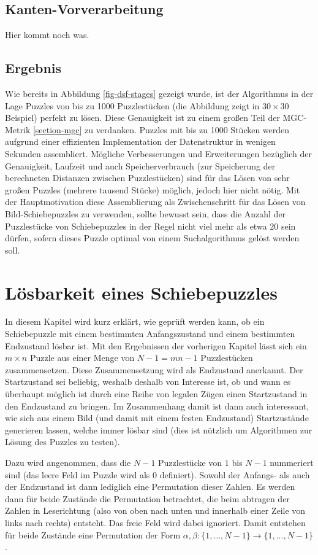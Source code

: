 \documentclass{whswinvcbook}
\begin{document}
\section{Kanten-Vorverarbeitung}
Hier kommt noch was.
\section{Ergebnis}
Wie bereits in Abbildung \ref{fig-dsf-stages} gezeigt wurde, ist der Algorithmus in der Lage Puzzles von bis zu 1000 Puzzlestücken (die Abbildung zeigt in $30\times30$ Beispiel) perfekt zu lösen. Diese Genauigkeit ist zu einem großen Teil der MGC-Metrik \ref{section-mgc} zu verdanken. Puzzles mit bis zu 1000 Stücken werden aufgrund einer effizienten Implementation der Datenstruktur in wenigen Sekunden assembliert. Mögliche Verbesserungen und Erweiterungen bezüglich der Genauigkeit, Laufzeit und auch Speicherverbrauch (zur Speicherung der berechneten Distanzen zwischen Puzzlestücken) sind für das Lösen von sehr großen Puzzles (mehrere tausend Stücke) möglich, jedoch hier nicht nötig. Mit der Hauptmotivation diese Assemblierung als Zwischenschritt für das Lösen von Bild-Schiebepuzzles zu verwenden, sollte bewusst sein, dass die Anzahl der Puzzlestücke von Schiebepuzzles in der Regel nicht viel mehr als etwa $20$ sein dürfen, sofern dieses Puzzle optimal von einem Suchalgorithmus gelöst werden soll.
\chapter{Lösbarkeit eines Schiebepuzzles}
In diesem Kapitel wird kurz erklärt, wie geprüft werden kann, ob ein Schiebepuzzle mit einem bestimmten Anfangszustand und einem bestimmten Endzustand lösbar ist. Mit den Ergebnissen der vorherigen Kapitel lässt sich ein $m\times n$ Puzzle aus einer Menge von $N-1=mn-1$ Puzzlestücken zusammensetzen. Diese Zusammensetzung wird als Endzustand anerkannt. Der Startzustand sei beliebig, weshalb deshalb von Interesse ist, ob und wann es überhaupt möglich ist durch eine Reihe von legalen Zügen einen Startzustand in den Endzustand zu bringen. Im Zusammenhang damit ist dann auch interessant, wie sich aus einem Bild (und damit mit einem festen Endzustand) Startzustände generieren lassen, welche immer lösbar sind (dies ist nützlich um Algorithmen zur Lösung des Puzzles zu testen).

Dazu wird angenommen, dass die $N-1$ Puzzlestücke von $1$ bis $N-1$ nummeriert sind (das leere Feld im Puzzle wird als $0$ definiert). Sowohl der Anfangs- als auch der Endzustand ist dann lediglich eine Permutation dieser Zahlen. Es werden dann für beide Zustände die Permutation betrachtet, die beim abtragen der Zahlen in Leserichtung (also von oben nach unten und innerhalb einer Zeile von links nach rechts) entsteht. Das freie Feld wird dabei ignoriert. Damit entstehen für beide Zustände eine Permutation der Form $\alpha,\beta:\{1,\dots,N-1\}\longrightarrow\{1,\dots,N-1\}$.
\end{document}
